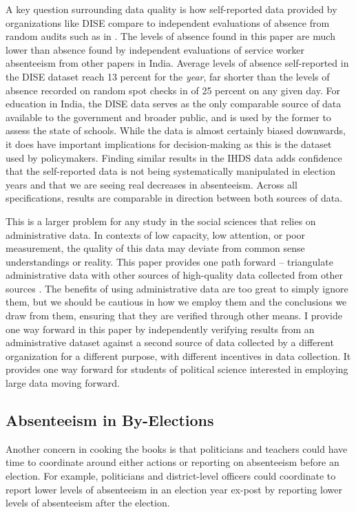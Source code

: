 \documentclass[hidelinks, 12pt, article, oneside]{memoir}
\begin{document}
A key question surrounding data quality is how self-reported data provided by organizations like DISE compare to independent evaluations of absence from random audits such as in \cite{Banerjee2006, Chaudhury2006}.  The levels of absence found in this paper are much lower than absence found by independent evaluations of service worker absenteeism from other papers in India.  Average levels of absence self-reported in the DISE dataset reach 13 percent for the \emph{year}, far shorter than the levels of absence recorded on random spot checks in \cite{Chaudhury2006} of 25 percent on any given day.  For education in India, the DISE data serves as the only comparable source of data available to the government and broader public, and is used by the former to assess the state of schools.  While the data is almost certainly biased downwards, it does have important implications for decision-making as this is the dataset used by policymakers.  Finding similar results in the IHDS data adds confidence that the self-reported data is not being systematically manipulated in election years and that we are seeing real decreases in absenteeism.  Across all specifications, results are comparable in direction between both sources of data.

This is a larger problem for any study in the social sciences that relies on administrative data.  In contexts of low capacity, low attention, or poor measurement, the quality of this data may deviate from common sense understandings or reality.  This paper provides one path forward -- triangulate administrative data with other sources of high-quality data collected from other sources \citep{Herrera2007}.  The benefits of using administrative data are too great to simply ignore them, but we should be cautious in how we employ them and the conclusions we draw from them, ensuring that they are verified through other means.  I provide one way forward in this paper by independently verifying results from an administrative dataset against a second source of data collected by a different organization for a different purpose, with different incentives in data collection.  It provides one way forward for students of political science interested in employing large data moving forward.

\subsection{Absenteeism in By-Elections}

Another concern in cooking the books is that politicians and teachers could have time to coordinate around either actions or reporting on absenteeism before an election.  For example, politicians and district-level officers could coordinate to report lower levels of absenteeism in an election year ex-post by reporting lower levels of absenteeism after the election.
\end{document}
